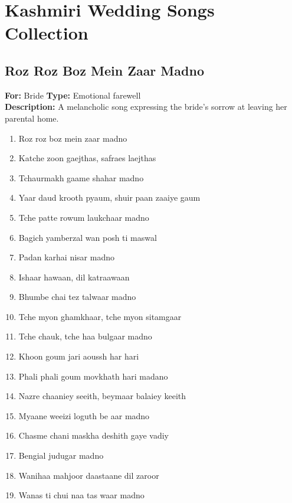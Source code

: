 \documentclass[12pt]{article}
\newcommand{\bigroman}[1]{\fontsize{16pt}{18pt}\selectfont\RaggedRight #1}
\begin{document}

\section*{Kashmiri Wedding Songs Collection}

\subsection*{Roz Roz Boz Mein Zaar Madno}
\textbf{For:} Bride \quad \textbf{Type:} Emotional farewell\\
\textbf{Description:} A melancholic song expressing the bride's sorrow at leaving her parental home.

\begin{multicols}{2}
\begin{enumerate}[leftmargin=*, label=\arabic*., font=\fontsize{16pt}{18pt}\selectfont]
  \item \bigroman{Roz roz boz mein zaar madno}
  \item \bigroman{Katche zoon gaejthas, safraes laejthas}
  \item \bigroman{Tchaurmakh gaame shahar madno}
  \item \bigroman{Yaar daud krooth pyaum, shuir paan zaaiye gaum}
  \item \bigroman{Tche patte rowum laukchaar madno}
  \item \bigroman{Bagich yamberzal wan posh ti maswal}
  \item \bigroman{Padan karhai nisar madno}
  \item \bigroman{Ishaar hawaan, dil katraawaan}
  \item \bigroman{Bhumbe chai tez talwaar madno}
  \item \bigroman{Tche myon ghamkhaar, tche myon sitamgaar}
  \item \bigroman{Tche chauk, tche haa bulgaar madno}
  \item \bigroman{Khoon goum jari aoussh har hari}
  \item \bigroman{Phali phali goum movkhath hari madano}
  \item \bigroman{Nazre chaaniey seeith, beymaar balaiey keeith}
  \item \bigroman{Myaane weeizi loguth be aar madno}
  \item \bigroman{Chasme chani maskha deshith gaye vadiy}
  \item \bigroman{Bengial judugar madno}
  \item \bigroman{Wanihaa mahjoor daastaane dil zaroor}
  \item \bigroman{Wanas ti chui naa tas waar madno}
\end{enumerate}


\end{multicols}
\end{document}
